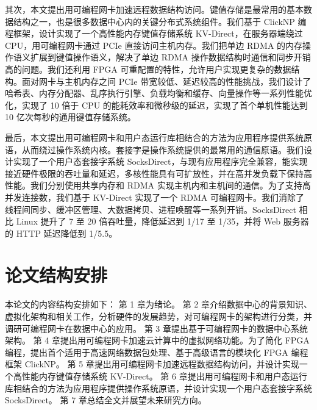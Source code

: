 其次，本文提出用可编程网卡加速远程数据结构访问。键值存储是最常用的基本数据结构之一，也是很多数据中心内的关键分布式系统组件。我们基于 ClickNP 编程框架，设计实现了一个高性能内存键值存储系统 KV-Direct，在服务器端绕过 CPU，用可编程网卡通过 PCIe 直接访问主机内存。我们把单边 RDMA 的内存操作语义扩展到键值操作语义，解决了单边 RDMA 操作数据结构时通信和同步开销高的问题。我们还利用 FPGA 可重配置的特性，允许用户实现更复杂的数据结构。面对网卡与主机内存之间 PCIe 带宽较低、延迟较高的性能挑战，我们设计了哈希表、内存分配器、乱序执行引擎、负载均衡和缓存、向量操作等一系列性能优化，实现了 10 倍于 CPU 的能耗效率和微秒级的延迟，实现了首个单机性能达到 10 亿次每秒的通用键值存储系统。

最后，本文提出用可编程网卡和用户态运行库相结合的方法为应用程序提供系统原语，从而绕过操作系统内核。套接字是操作系统提供的最常用的通信原语。我们设计实现了一个用户态套接字系统 SocksDirect，与现有应用程序完全兼容，能实现接近硬件极限的吞吐量和延迟，多核性能具有可扩放性，并在高并发负载下保持高性能。我们分别使用共享内存和 RDMA 实现主机内和主机间的通信。为了支持高并发连接数，我们基于 KV-Direct 实现了一个 RDMA 可编程网卡。我们消除了线程间同步、缓冲区管理、大数据拷贝、进程唤醒等一系列开销。SocksDirect 相比 Linux 提升了 7 至 20 倍吞吐量，降低延迟到 1/17 至 1/35，并将 Web 服务器的 HTTP 延迟降低到 1/5.5。


\section{论文结构安排}

本论文的内容结构安排如下：
第 1 章为绪论。
第 2 章介绍数据中心的背景知识、虚拟化架构和相关工作，分析硬件的发展趋势，对可编程网卡的架构进行分类，并调研可编程网卡在数据中心的应用。
第 3 章提出基于可编程网卡的数据中心系统架构。
第 4 章提出用可编程网卡加速云计算中的虚拟网络功能。为了简化 FPGA 编程，提出首个适用于高速网络数据包处理、基于高级语言的模块化 FPGA 编程框架 ClickNP。
第 5 章提出用可编程网卡加速远程数据结构访问，并设计实现一个高性能内存键值存储系统 KV-Direct。
第 6 章提出用可编程网卡和用户态运行库相结合的方法为应用程序提供操作系统原语，并设计实现一个用户态套接字系统 SocksDirect。
第 7 章总结全文并展望未来研究方向。